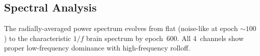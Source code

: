 \subsection{Spectral Analysis}

The radially-averaged power spectrum evolves from flat (noise-like at epoch
${\sim}100$) to the characteristic $1/f$ brain spectrum by epoch~600.  All
4~channels show proper low-frequency dominance with high-frequency rolloff.
